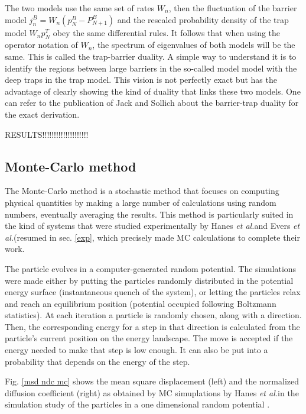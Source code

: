 \documentclass[a4paper,12pt]{article}
\newcommand{\jline}{\vspace{10pt}}
\newcommand{\etal}{\textit{et al.}}
\begin{document}
The two models use the same set of rates $W_n$, then the fluctuation of the barrier model $j_n^B=W_n\left(p_N^B-P_{N+1}^B\right)$ and the
rescaled probability density of the trap model $W_n p_N^T$ obey the same differential rules. It follows that when using the operator 
notation of $W_n$, the spectrum of eigenvalues of both models will be the same. This is called the trap-barrier duality. A simple way to
understand it is to identify the regions between large barriers in the so-called model model with the deep traps in the trap model. This
vision is not perfectly exact but has the advantage of clearly showing the kind of duality that links these two models. One can refer to
the publication of Jack and Sollich about the barrier-trap duality \cite{Jack2007} for the exact derivation.\jline

RESULTS!!!!!!!!!!!!!!!!!!!!

\subsection{Monte-Carlo method}
\label{monte-carlo}

The Monte-Carlo method is a stochastic method that focuses on computing physical quantities by making a large number of calculations using
random numbers, eventually averaging the results. This method is particularly suited in the kind of systems that were studied experimentally
by Hanes \etal and Evers \etal (resumed in sec. \ref{exp}, which precisely made MC calculations to complete their work.\jline

The particle evolves in a computer-generated random potential. The simulations were made either by putting the particles randomly distributed
in the potential energy surface (instantaneous quench of the system), or letting the particles relax and reach an equilibrium position 
(potential occupied following Boltzmann statistics). At each iteration a particle is randomly chosen, along with a direction. Then, the
corresponding energy for a step in that direction is calculated from the particle's current position on the energy landscape. The move is
accepted if the energy needed to make that step is low enough. It can also be put into a probability that depends on the energy of the step.\jline

Fig. \ref{msd ndc mc} shows the mean square displacement (left) and the normalized diffusion coefficient (right) as obtained by MC 
simuplations by Hanes \etal in the simulation study of the particles in a one dimensional random potential \cite{Hanes2012_2}.
\end{document}
